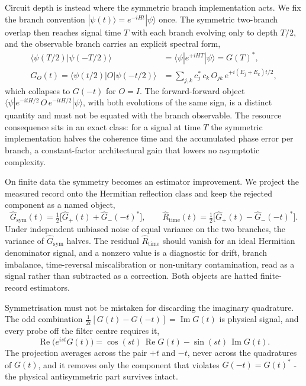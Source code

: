 Circuit depth is instead where the symmetric branch implementation acts. We fix the branch convention $|\psi(t)\rangle = e^{-iHt}|\psi\rangle$ once. The symmetric two-branch overlap then reaches signal time $T$ with each branch evolving only to depth $T/2$, and the observable branch carries an explicit spectral form,
\begin{equation}\label{res:half-depth-symmetric-branches}
\begin{aligned}
\langle\psi(T/2)|\psi(-T/2)\rangle &= \langle\psi|e^{+iHT}|\psi\rangle = G(T)^* ,\\
G_O(t) = \langle\psi(t/2)|O|\psi(-t/2)\rangle &= \sum_{j,k} c_j^*\,c_k\,O_{jk}\,e^{+i(E_j+E_k)t/2} ,
\end{aligned}
\end{equation}
which collapses to $G(-t)$ for $O = I$. The forward-forward object $\langle\psi|e^{-itH/2}\,O\,e^{-itH/2}|\psi\rangle$, with both evolutions of the same sign, is a distinct quantity and must not be equated with the branch observable. The resource consequence sits in an exact class: for a signal at time $T$ the symmetric implementation halves the coherence time and the accumulated phase error per branch, a constant-factor architectural gain that lowers no asymptotic complexity.

On finite data the symmetry becomes an estimator improvement. We project the measured record onto the Hermitian reflection class and keep the rejected component as a named object,
\begin{equation}\label{def:symmetric-record-projection}
\widehat G_{\mathrm{sym}}(t) = \tfrac{1}{2}\big[\widehat G_+(t) + \widehat G_-(-t)^*\big],
\qquad
\widehat R_{\mathrm{time}}(t) = \tfrac{1}{2}\big[\widehat G_+(t) - \widehat G_-(-t)^*\big].
\end{equation}
Under independent unbiased noise of equal variance on the two branches, the variance of $\widehat G_{\mathrm{sym}}$ halves. The residual $\widehat R_{\mathrm{time}}$ should vanish for an ideal Hermitian denominator signal, and a nonzero value is a diagnostic for drift, branch imbalance, time-reversal miscalibration or non-unitary contamination, read as a signal rather than subtracted as a correction. Both objects are hatted finite-record estimators.

Symmetrisation must not be mistaken for discarding the imaginary quadrature. The odd combination $\frac{1}{2i}[G(t) - G(-t)] = \operatorname{Im} G(t)$ is physical signal, and every probe off the filter centre requires it,
\begin{equation}\label{irf:odd-channel-is-physical}
\operatorname{Re}\big(e^{ist}G(t)\big) = \cos(st)\,\operatorname{Re} G(t) - \sin(st)\,\operatorname{Im} G(t) .
\end{equation}
The projection averages across the pair $+t$ and $-t$, never across the quadratures of $G(t)$, and it removes only the component that violates $G(-t) = G(t)^*$ - the physical antisymmetric part survives intact.


